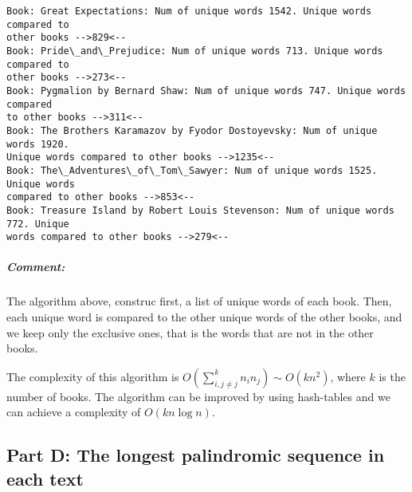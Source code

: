 \documentclass[11pt]{article}
\begin{document}
    \begin{Verbatim}[commandchars=\\\{\}]
Book: Great Expectations: Num of unique words 1542. Unique words compared to
other books -->829<--
Book: Pride\_and\_Prejudice: Num of unique words 713. Unique words compared to
other books -->273<--
Book: Pygmalion by Bernard Shaw: Num of unique words 747. Unique words compared
to other books -->311<--
Book: The Brothers Karamazov by Fyodor Dostoyevsky: Num of unique words 1920.
Unique words compared to other books -->1235<--
Book: The\_Adventures\_of\_Tom\_Sawyer: Num of unique words 1525. Unique words
compared to other books -->853<--
Book: Treasure Island by Robert Louis Stevenson: Num of unique words 772. Unique
words compared to other books -->279<--
    \end{Verbatim}

    \hypertarget{comment}{%
\subparagraph{Comment:}\label{comment}}

The algorithm above, construc first, a list of unique words of each
book. Then, each unique word is compared to the other unique words of
the other books, and we keep only the exclusive ones, that is the words
that are not in the other books.

The complexity of this algorithm is
\(O(\sum_{i,j\neq j}^k n_in_j) \sim O(kn^2)\), where \(k\) is the number
of books. The algorithm can be improved by using hash-tables and we can
achieve a complexity of \(O(kn\log n)\). 

    \hypertarget{part-d-the-longest-palindromic-sequence-in-each-text}{%
\subsection{Part D: The longest palindromic sequence in each
text}\label{part-d-the-longest-palindromic-sequence-in-each-text}}
\end{document}
